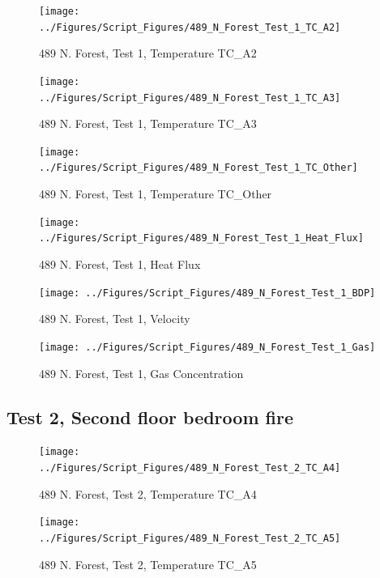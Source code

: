 \documentclass[12pt,oneside]{book}
\begin{document}
\begin{figure}[!ht]
\texttt{[image: ../Figures/Script\_Figures/489\_N\_Forest\_Test\_1\_TC\_A2]}
\caption{489 N. Forest, Test 1, Temperature TC\_A2}
\label{fig:489_N_Forest_Test_1_TC_A2}
\end{figure}

\begin{figure}[!ht]
\texttt{[image: ../Figures/Script\_Figures/489\_N\_Forest\_Test\_1\_TC\_A3]}
\caption{489 N. Forest, Test 1, Temperature TC\_A3}
\label{fig:489_N_Forest_Test_1_TC_A3}
\end{figure}

\begin{figure}[!ht]
\texttt{[image: ../Figures/Script\_Figures/489\_N\_Forest\_Test\_1\_TC\_Other]}
\caption{489 N. Forest, Test 1, Temperature TC\_Other}
\label{fig:489_N_Forest_Test_1_TC_Other}
\end{figure}

\begin{figure}[!ht]
\texttt{[image: ../Figures/Script\_Figures/489\_N\_Forest\_Test\_1\_Heat\_Flux]}
\caption{489 N. Forest, Test 1, Heat Flux}
\label{fig:489_N_Forest_Test_1_Heat_Flux}
\end{figure}

\begin{figure}[!ht]
\texttt{[image: ../Figures/Script\_Figures/489\_N\_Forest\_Test\_1\_BDP]}
\caption{489 N. Forest, Test 1, Velocity}
\label{fig:489_N_Forest_Test_1_BDP}
\end{figure}

\begin{figure}[!ht]
\texttt{[image: ../Figures/Script\_Figures/489\_N\_Forest\_Test\_1\_Gas]}
\caption{489 N. Forest, Test 1, Gas Concentration}
\label{fig:489_N_Forest_Test_1_Gas}
\end{figure}


\clearpage

\subsection{Test 2, Second floor bedroom fire}

\begin{figure}[!ht]
\texttt{[image: ../Figures/Script\_Figures/489\_N\_Forest\_Test\_2\_TC\_A4]}
\caption{489 N. Forest, Test 2, Temperature TC\_A4}
\label{fig:489_N_Forest_Test_2_TC_A4}
\end{figure}

\begin{figure}[!ht]
\texttt{[image: ../Figures/Script\_Figures/489\_N\_Forest\_Test\_2\_TC\_A5]}
\caption{489 N. Forest, Test 2, Temperature TC\_A5}
\label{fig:489_N_Forest_Test_2_TC_A5}
\end{figure}
\end{document}

